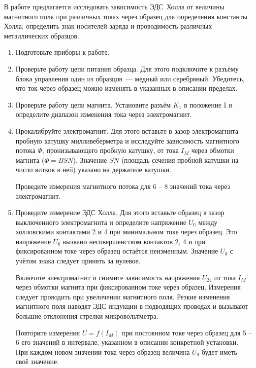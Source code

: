 \begin{lab:task}

В работе предлагается исследовать зависимость ЭДС~Холла от величины магнитного поля при различных токах через образец для определения константы Холла; определить знак носителей заряда и проводимость различных металлических образцов.

\begin{enumerate}

\item{Подготовьте приборы к работе.}

\item{ Проверьте работу цепи питания образца. Для этого подключите к разъёму блока управления один из образцов~--- медный или серебряный. Убедитесь, что ток через образец можно изменять в указанных в описании пределах.}
\item{ Проверьте работу цепи магнита. Установите разъём $K_1$ в положение I и определите диапазон изменения тока через электромагнит.}
\item{ Прокалибруйте электромагнит. Для этого вставьте в зазор электромагнита пробную катушку милливеберметра и исследуйте зависимость магнитного потока $\Phi$, пронизывающего пробную катушку, от тока $I_M$ через обмотки магнита ($\Phi=BSN$). Значение $SN$ (площадь сечения пробной катушки на число витков в ней) указано на держателе катушки.

Проведите измерения магнитного потока для 6 -- 8 значений тока через электромагнит.}

\item{ Проведите измерение ЭДС Холла. Для этого вставьте образец в зазор выключенного электромагнита и определите напряжение $U_0$ между холловскими контактами 2 и 4 при минимальном токе через образец. Это напряжение $U_0$ вызвано несовершенством контактов 2, 4 и при фиксированном токе через образец остаётся неизменным. Значение $U_0$ с учётом знака следует принять за нулевое.

Включите электромагнит и снимите зависимость напряжения $U_{24}$ от тока $I_M$ через обмотки магнита при фиксированном токе через образец. Измерения следует проводить при  увеличении магнитного поля. Резкие изменения магнитного поля наводят ЭДС индукции в подводящих проводах и вызывают большие отклонения стрелки микровольтметра.

Повторите измерения $U=f(I_{M})$ при постоянном токе через образец для 5 -- 6 его значений в интервале, указанном в описании конкретной установки. При каждом новом значении тока через образец величина $U_0$ будет иметь своё значение.

}
\end{enumerate}
\end{lab:task}

